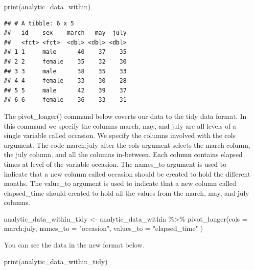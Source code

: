\documentclass[
]{krantz}
\makeatletter
\newenvironment{Shaded}{\begin{snugshade}}{\end{snugshade}}
\newcommand{\AttributeTok}[1]{\textcolor[rgb]{0.61,0.61,0.61}{#1}}
\newcommand{\FunctionTok}[1]{\textcolor[rgb]{0,0,0}{#1}}
\newcommand{\NormalTok}[1]{#1}
\newcommand{\OtherTok}[1]{\textcolor[rgb]{0.37,0.37,0.37}{#1}}
\newcommand{\SpecialCharTok}[1]{\textcolor[rgb]{0,0,0}{#1}}
\newcommand{\StringTok}[1]{\textcolor[rgb]{0.5,0.5,0.5}{#1}}
\newenvironment{kframe}{%
\medskip{}
\setlength{\fboxsep}{.8em}
 \def\at@end@of@kframe{}%
 \ifinner\ifhmode%
  \def\at@end@of@kframe{\end{minipage}}%
  \begin{minipage}{\columnwidth}%
 \fi\fi%
 \def\FrameCommand##1{\hskip\@totalleftmargin \hskip-\fboxsep
 \colorbox{shadecolor}{##1}\hskip-\fboxsep
     \hskip-\linewidth \hskip-\@totalleftmargin \hskip\columnwidth}%
 \MakeFramed {\advance\hsize-\width
   \@totalleftmargin\z@ \linewidth\hsize
   \@setminipage}}%
 {\par\unskip\endMakeFramed%
 \at@end@of@kframe}
\renewenvironment{Shaded}{\begin{kframe}}{\end{kframe}}
\makeatother
\begin{document}
\begin{Shaded}
\begin{Highlighting}[]
\FunctionTok{print}\NormalTok{(analytic\_data\_within)}
\end{Highlighting}
\end{Shaded}

\begin{verbatim}
## # A tibble: 6 x 5
##   id    sex    march   may  july
##   <fct> <fct>  <dbl> <dbl> <dbl>
## 1 1     male      40    37    35
## 2 2     female    35    32    30
## 3 3     male      38    35    33
## 4 4     female    33    30    28
## 5 5     male      42    39    37
## 6 6     female    36    33    31
\end{verbatim}

The pivot\_longer() command below coverts our data to the tidy data format. In this command we specify the columns march, may, and july are all levels of a single variable called occasion. We specify the columns involved with the cols argument. The code march:july after the cols argument selects the march column, the july column, and all the columns in-between. Each column contains elapsed times at level of the variable occasion. The names\_to argument is used to indicate that a new column called occasion should be created to hold the different months. The value\_to argument is used to indicate that a new column called elapsed\_time should created to hold all the values from the march, may, and july columns.

\begin{Shaded}
\begin{Highlighting}[]
\NormalTok{analytic\_data\_within\_tidy }\OtherTok{\textless{}{-}}\NormalTok{ analytic\_data\_within }\SpecialCharTok{\%\textgreater{}\%}
  \FunctionTok{pivot\_longer}\NormalTok{(}\AttributeTok{cols =}\NormalTok{ march}\SpecialCharTok{:}\NormalTok{july,}
               \AttributeTok{names\_to =} \StringTok{"occasion"}\NormalTok{,}
               \AttributeTok{values\_to =} \StringTok{"elapsed\_time"}
\NormalTok{  )}
\end{Highlighting}
\end{Shaded}

You can see the data in the new format below.

\begin{Shaded}
\begin{Highlighting}[]
\FunctionTok{print}\NormalTok{(analytic\_data\_within\_tidy)}
\end{Highlighting}
\end{Shaded}
\end{document}
